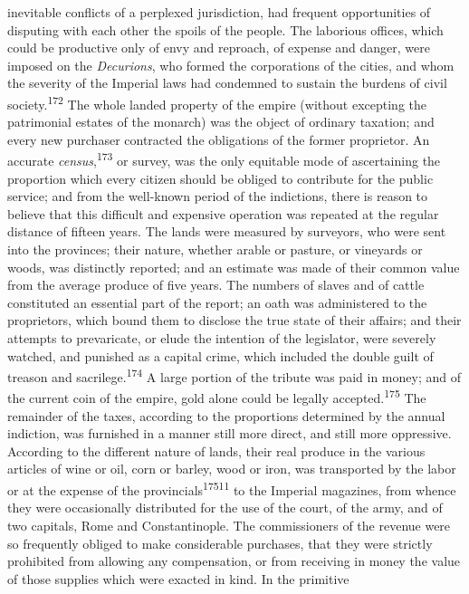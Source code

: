 inevitable conflicts of a perplexed jurisdiction, had frequent
opportunities of disputing with each other the spoils of the
people. The laborious offices, which could be productive only of
envy and reproach, of expense and danger, were imposed on the
\textit{Decurions}, who formed the corporations of the cities, and whom
the severity of the Imperial laws had condemned to sustain the
burdens of civil society.\textsuperscript{172} The whole landed property of the
empire (without excepting the patrimonial estates of the monarch)
was the object of ordinary taxation; and every new purchaser
contracted the obligations of the former proprietor. An accurate
\textit{census},\textsuperscript{173} or survey, was the only equitable mode of
ascertaining the proportion which every citizen should be obliged
to contribute for the public service; and from the well-known
period of the indictions, there is reason to believe that this
difficult and expensive operation was repeated at the regular
distance of fifteen years. The lands were measured by surveyors,
who were sent into the provinces; their nature, whether arable or
pasture, or vineyards or woods, was distinctly reported; and an
estimate was made of their common value from the average produce
of five years. The numbers of slaves and of cattle constituted an
essential part of the report; an oath was administered to the
proprietors, which bound them to disclose the true state of their
affairs; and their attempts to prevaricate, or elude the
intention of the legislator, were severely watched, and punished
as a capital crime, which included the double guilt of treason
and sacrilege.\textsuperscript{174} A large portion of the tribute was paid in
money; and of the current coin of the empire, gold alone could be
legally accepted.\textsuperscript{175} The remainder of the taxes, according to
the proportions determined by the annual indiction, was furnished
in a manner still more direct, and still more oppressive.
According to the different nature of lands, their real produce in
the various articles of wine or oil, corn or barley, wood or
iron, was transported by the labor or at the expense of the
provincials\textsuperscript{17511} to the Imperial magazines, from whence they
were occasionally distributed for the use of the court, of the
army, and of two capitals, Rome and Constantinople. The
commissioners of the revenue were so frequently obliged to make
considerable purchases, that they were strictly prohibited from
allowing any compensation, or from receiving in money the value
of those supplies which were exacted in kind. In the primitive
